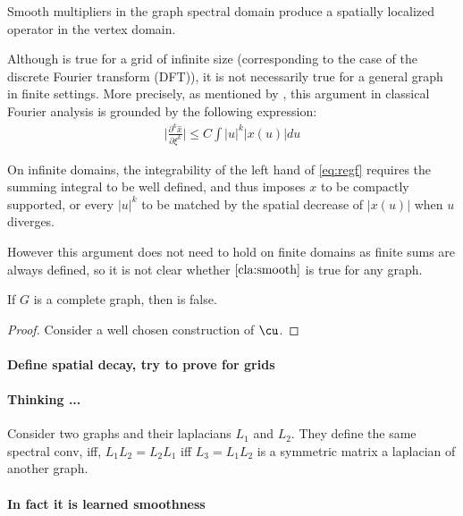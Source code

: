 \begin{claim} Smooth multipliers in the graph spectral domain produce a spatially localized operator in the vertex domain.
\label{cla:smooth}
\end{claim}

Although  is true for a grid of infinite size (corresponding to the case of the discrete Fourier transform (DFT)), it is not necessarily true for a general graph in finite settings. More precisely, as mentioned by \cite{henaff2015deep}, this argument in classical Fourier analysis is grounded by the following expression:
\begin{gather}
\bigg|\frac{\partial^k{\hat{x}}}{\partial{\xi^k}}\bigg| \leq C \int |u|^k|x(u)|du \label{eq:regf}
\end{gather}

On infinite domains, the integrability of the left hand of \eqref{eq:regf} requires the summing integral to be well defined, and thus imposes $x$ to be compactly supported, or every $|u|^k$ to be matched by the spatial decrease of $|x(u)|$ when $u$ diverges.

However this argument does not need to hold on finite domains as finite sums are always defined, so it is not clear whether $\ref{cla:smooth}$ is true for any graph.

\begin{proposition} If $G$ is a complete graph, then  is false.
\end{proposition}

\begin{proof}
Consider a well chosen construction of $\cu$.
\end{proof}

\paragraph{Define spatial decay, try to prove for grids}

\paragraph{Thinking ...}
Consider two graphs and their laplacians $L_1$ and $L_2$. They define the same spectral conv, iff, $L_1L_2 = L_2L_1$ iff $L_3 = L_1L_2$ is a symmetric matrix \ie a laplacian of another graph.

\paragraph{In fact it is learned smoothness}

